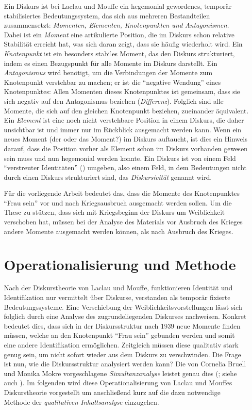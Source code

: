 \documentclass[12pt, titlepage=true, toc=bib]{scrartcl}
\begin{document}
Ein Diskurs ist bei Laclau und Mouffe ein hegemonial gewordenes, temporär stabilisiertes Bedeutungssystem, das sich aus mehreren Bestandteilen zusammensetzt: \textit{Momenten, Elementen, Knotenpunkten \textit{und }Antagonismen}. Dabei ist ein \textit{Moment} eine artikulierte Position, die im Diskurs schon relative Stabilität erreicht hat, was sich daran zeigt, dass sie häufig wiederholt wird. Ein \textit{Knotenpunkt} ist ein besonders stabiles Moment, das den Diskurs strukturiert, indem es einen Bezugspunkt für alle Momente im Diskurs darstellt. Ein \textit{Antagonismus} wird benötigt, um die Verbindungen der Momente zum Knotenpunkt verstehbar zu machen; er ist die "`negative Wendung"' eines Knotenpunktes: Allen Momenten dieses Knotenpunktes ist gemeinsam, dass sie sich negativ auf den Antagonismus beziehen (\textit{Differenz}). Folglich sind alle Momente, die sich auf den gleichen Knotenpunkt beziehen, zueinander äquivalent. Ein \textit{Element} ist eine noch nicht verstehbare Position in einem Diskurs, die daher unsichtbar ist und immer nur im Rückblick ausgemacht werden kann. Wenn ein neues Moment (der oder das Moment?) im Diskurs auftaucht, ist dies ein Hinweis darauf, dass die Position vorher als Element schon im Diskurs vorhanden gewesen sein muss und nun hegemonial werden konnte. Ein Diskurs ist von einem Feld "`verstreuter Identitäten"' (\cite[vgl.][6]{bruell_chancen_2006}) umgeben, also einem Feld, in dem Bedeutungen nicht durch einen Diskurs strukturiert sind, das \textit{Diskursivität} genannt wird. 

Für die vorliegende Arbeit bedeutet das, dass die Momente des Knotenpunktes "`Frau sein"' vor und nach Kriegsausbruch ausgemacht werden sollen. Um die These zu stützen, dass sich mit Kriegsbeginn der Diskurs um Weiblichkeit verschoben hat, müssen bei der Analyse des Materials vor Ausbruch des Krieges andere Momente ausgemacht werden können, als nach Ausbruch des Krieges. 



\section{Operationalisierung und Methode}

Nach der Diskurstheorie von Laclau und Mouffe, funktionieren Identität und Identifikation nur vermittelt über Diskurse, verstanden als temporär fixierte Bedeutungssysteme. Eine Verschiebung der Weiblichkeitsvorstellungen lässt sich folglich durch eine Analyse des zugrundeliegenden Diskurses nachweisen. Konkret bedeutet dies, dass sich in der Diskursstruktur nach 1939 neue Momente finden müssen, welche an den Knotenpunkt "`Frau sein"' gebunden werden und somit eine andere Identifikation ermöglichen. Zeitgleich müssen diese qualitativ stark genug sein, um nicht sofort wieder aus dem Diskurs zu verschwinden. Die Frage ist nun, wie die Diskursstruktur analysiert werden kann? Die von Cornelia Bruell und Monika Mokre vorgeschlagene \textit{Simultanzanalyse} leistet genau dies (\cite*{bruell_chancen_2006}; siehe auch \cite{nonhoff_kollektive_2007}). Im folgenden wird diese Operationalisierung von Laclau und Mouffes Diskurstheorie vorgestellt um anschließend kurz auf die dazu notwendige Methode der \textit{qualitativen Inhaltsanalyse} einzugehen.
\end{document}

